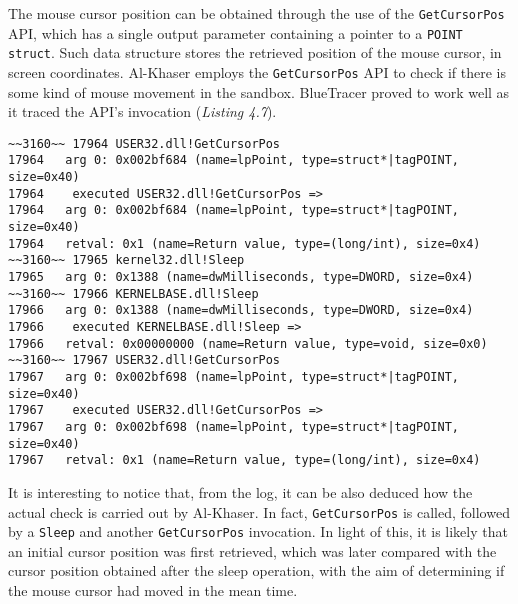 The mouse cursor position can be obtained through the use of the \texttt{GetCursorPos} API, which has a single output parameter containing a pointer to a \texttt{POINT struct}. Such data structure stores the retrieved position of the mouse cursor, in screen coordinates. Al-Khaser employs the \texttt{GetCursorPos} API to check if there is some kind of mouse movement in the sandbox. BlueTracer proved to work well as it traced the API's invocation (\textit{Listing 4.7}).

\vspace{0.5cm}
\begin{lstlisting}[caption={\texttt{GetCursorPos} evidence in the log },captionpos=b]
~~3160~~ 17964 USER32.dll!GetCursorPos
17964 	arg 0: 0x002bf684 (name=lpPoint, type=struct*|tagPOINT, size=0x40)
17964    executed USER32.dll!GetCursorPos =>
17964 	arg 0: 0x002bf684 (name=lpPoint, type=struct*|tagPOINT, size=0x40)
17964 	retval: 0x1 (name=Return value, type=(long/int), size=0x4)
~~3160~~ 17965 kernel32.dll!Sleep
17965 	arg 0: 0x1388 (name=dwMilliseconds, type=DWORD, size=0x4)
~~3160~~ 17966 KERNELBASE.dll!Sleep
17966 	arg 0: 0x1388 (name=dwMilliseconds, type=DWORD, size=0x4)
17966    executed KERNELBASE.dll!Sleep =>
17966 	retval: 0x00000000 (name=Return value, type=void, size=0x0)
~~3160~~ 17967 USER32.dll!GetCursorPos
17967 	arg 0: 0x002bf698 (name=lpPoint, type=struct*|tagPOINT, size=0x40)
17967    executed USER32.dll!GetCursorPos =>
17967 	arg 0: 0x002bf698 (name=lpPoint, type=struct*|tagPOINT, size=0x40)
17967 	retval: 0x1 (name=Return value, type=(long/int), size=0x4)
\end{lstlisting}

It is interesting to notice that, from the log, it can be also deduced how the actual check is carried out by Al-Khaser. In fact, \texttt{GetCursorPos} is called, followed by a \texttt{Sleep} and another \texttt{GetCursorPos} invocation. In light of this, it is likely that an initial cursor position was first retrieved, which was later compared with the cursor position obtained after the sleep operation, with the aim of determining if the mouse cursor had moved in the mean time.
  

